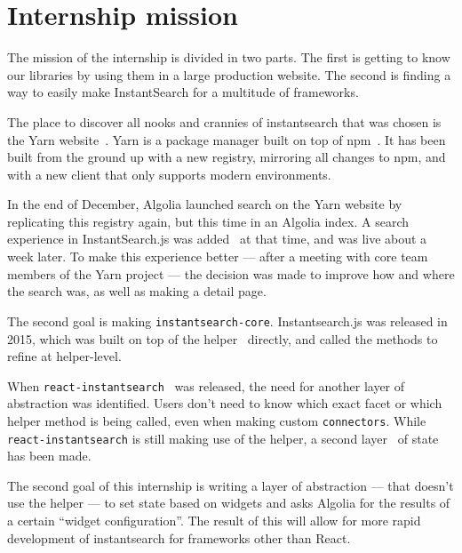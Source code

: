 
\chapter{Internship mission} %
\label{chp:mission}

The mission of the internship is divided in two parts. The first is getting to know our libraries by using them in a large production website. The second is finding a way to easily make InstantSearch for a multitude of frameworks.

The place to discover all nooks and crannies of instantsearch that was chosen is the Yarn website~\cite{yarn-site}. Yarn is a package manager built on top of npm~\cite{npm-github}. It has been built from the ground up with a new registry, mirroring all changes to npm, and with a new client that only supports modern environments.

In the end of December, Algolia launched search on the Yarn website by replicating this registry again, but this time in an Algolia index. A search experience in InstantSearch.js was added~\cite{yarn-pr-add-algolia} at that time, and was live about a week later. To make this experience better --- after a meeting with core team members of the Yarn project --- the decision was made to improve how and where the search was, as well as making a detail page.

The second goal is making {\tt instantsearch-core}. Instantsearch.js was released in 2015, which was built on top of the helper~\cite{algolia-js-helper} directly, and called the methods to refine at helper-level.

When {\tt react-instantsearch}~\cite{react-instantsearch} was released, the need for another layer of abstraction was identified. Users don't need to know which exact facet or which helper method is being called, even when making custom {\tt connectors}\cite{react-instantsearch-connectors}. While {\tt react-instantsearch} is still making use of the helper, a second layer~\cite{react-instantsearch-search-state} of state has been made.

The second goal of this internship is writing a layer of abstraction --- that doesn't use the helper --- to set state based on widgets and asks Algolia for the results of a certain ``widget configuration''. The result of this will allow for more rapid development of instantsearch for frameworks other than React.
